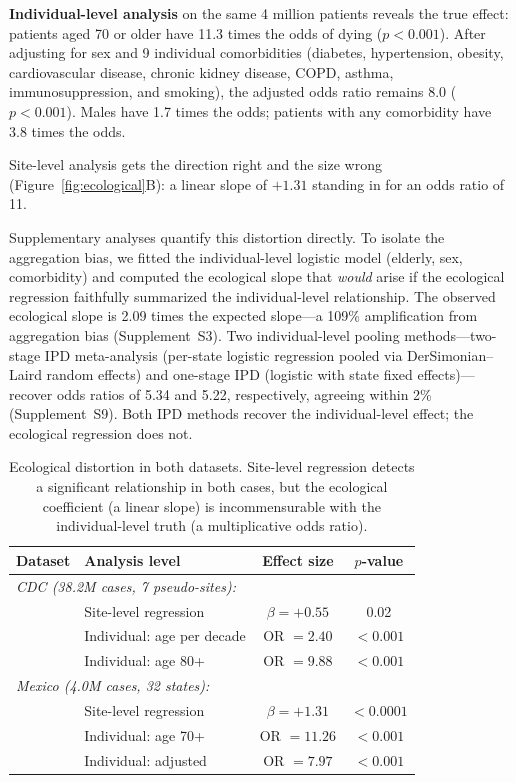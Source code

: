 \documentclass[11pt]{article}
\begin{document}
\textbf{Individual-level analysis} on the same 4 million patients reveals the
true effect: patients aged 70 or older have 11.3 times the odds of dying
($p < 0.001$).  After adjusting for sex and 9 individual comorbidities
(diabetes, hypertension, obesity, cardiovascular disease, chronic kidney
disease, COPD, asthma, immunosuppression, and smoking), the adjusted odds
ratio remains 8.0 ($p < 0.001$).  Males have 1.7 times the odds;
patients with any comorbidity have 3.8 times the odds.

Site-level analysis gets the direction right and the size wrong (Figure~\ref{fig:ecological}B): a linear
slope of $+1.31$ standing in for an odds ratio of 11.

Supplementary analyses quantify this distortion directly.  To isolate the
aggregation bias, we fitted the individual-level logistic model
(elderly, sex, comorbidity) and computed the ecological slope that
\emph{would} arise if the ecological regression faithfully summarized the
individual-level relationship.  The observed ecological slope is 2.09 times
the expected slope---a 109\% amplification from aggregation bias
(Supplement~S3).  Two individual-level pooling methods---two-stage IPD
meta-analysis (per-state logistic regression pooled via DerSimonian--Laird
random effects) and one-stage IPD (logistic with state fixed
effects)---recover odds ratios of 5.34 and 5.22, respectively, agreeing
within 2\% (Supplement~S9).  Both IPD methods recover the individual-level effect; the ecological regression does not.

\begin{table}[t]
\centering
\caption{Ecological distortion in both datasets.  Site-level regression
detects a significant relationship in both cases, but the ecological
coefficient (a linear slope) is incommensurable with the individual-level
truth (a multiplicative odds ratio).}
\label{tab:ecological}
\begin{tabular}{llcc}
\toprule
Dataset & Analysis level & Effect size & $p$-value \\
\midrule
\multicolumn{4}{l}{\emph{CDC (38.2M cases, 7 pseudo-sites):}} \\
& Site-level regression & $\beta = +0.55$ & 0.02 \\
& Individual: age per decade & OR $= 2.40$ & $< 0.001$ \\
& Individual: age 80+ & OR $= 9.88$ & $< 0.001$ \\
\midrule
\multicolumn{4}{l}{\emph{Mexico (4.0M cases, 32 states):}} \\
& Site-level regression & $\beta = +1.31$ & $< 0.0001$ \\
& Individual: age 70+ & OR $= 11.26$ & $< 0.001$ \\
& Individual: adjusted & OR $= 7.97$ & $< 0.001$ \\
\bottomrule
\end{tabular}
\end{table}
\end{document}
